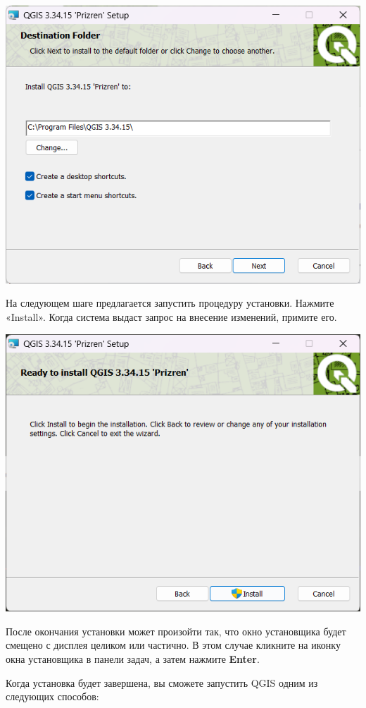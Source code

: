 \documentclass[
  12pt,
]{book}
\begin{document}
\includegraphics{images/Index0/win03.png}

На следующем шаге предлагается запустить процедуру установки. Нажмите «Install». Когда система выдаст запрос на внесение изменений, примите его.

\includegraphics{images/Index0/win04.png}

После окончания установки может произойти так, что окно установщика будет смещено с дисплея целиком или частично. В этом случае кликните на иконку окна установщика в панели задач, а затем нажмите \textbf{Enter}.

Когда установка будет завершена, вы сможете запустить QGIS одним из следующих способов:
\end{document}
